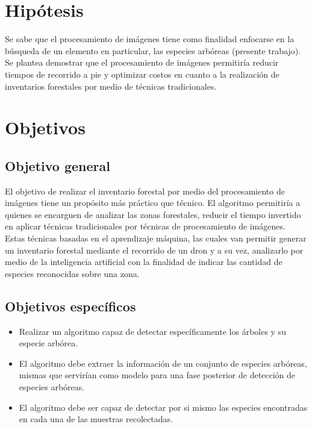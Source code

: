 \documentclass[a0,portrait]{a0poster}
\begin{document}
\begin{multicols}{2}
\section*{Hipótesis}
Se sabe que el procesamiento de imágenes tiene como finalidad enfocarse en la búsqueda de un elemento en particular, las especies arbóreas (presente trabajo). Se plantea demostrar que el procesamiento de imágenes permitiría reducir tiempos de recorrido a pie y optimizar costos en cuanto a la realización de inventarios forestales por medio de técnicas tradicionales.


\section*{Objetivos}
\subsection*{Objetivo general}
El objetivo de realizar el inventario forestal por medio del procesamiento de
imágenes tiene un propósito más práctico que técnico. El algoritmo permitiría a quienes se encarguen de analizar las zonas forestales, reducir el tiempo invertido en aplicar técnicas tradicionales por técnicas de procesamiento de imágenes.\\

Estas técnicas  basadas en el aprendizaje máquina, las cuales van permitir
generar un inventario forestal mediante el recorrido de un dron y a su vez, analizarlo por medio de la inteligencia artificial con la finalidad de indicar las cantidad de especies reconocidas sobre una zona.
\subsection*{Objetivos específicos}
\begin{itemize}
\item Realizar un algoritmo capaz de detectar específicamente los árboles y su especie arbórea.
\end{itemize}

\begin{itemize}
\item El algoritmo debe extraer la información de un conjunto de especies arbóreas, mismas que servirían como modelo para una fase posterior de detección de especies arbóreas.
\end{itemize}

\begin{itemize}
\item El algoritmo debe ser capaz de detectar por si mismo las especies encontradas en cada una de las muestras recolectadas.
\end{itemize}
\bigskip


\end{multicols}
\end{document}

